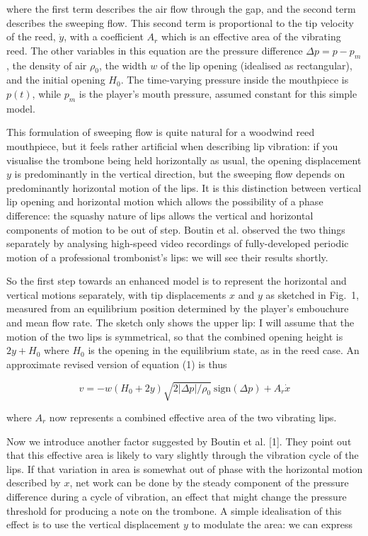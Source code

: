   where the first term describes the air flow through the gap, and the second 
  term describes the sweeping flow. This second term is proportional to the tip 
  velocity of the reed, $\dot{y}$, with a coefficient $A_r$ which is an 
  effective area of the vibrating reed. The other variables in this equation 
  are the pressure difference $\Delta p = p-p_m$, the density of air $\rho_0$, 
  the width $w$ of the lip opening (idealised as rectangular), and the initial 
  opening $H_0$. The time-varying pressure inside the mouthpiece is $p(t)$, 
  while $p_m$ is the player's mouth pressure, assumed constant for this simple 
  model. 

  This formulation of sweeping flow is quite natural for a woodwind reed 
  mouthpiece, but it feels rather artificial when describing lip vibration: if 
  you visualise the trombone being held horizontally as usual, the opening 
  displacement $y$ is predominantly in the vertical direction, but the sweeping 
  flow depends on predominantly horizontal motion of the lips. It is this 
  distinction between vertical lip opening and horizontal motion which allows 
  the possibility of a phase difference: the squashy nature of lips allows the 
  vertical and horizontal components of motion to be out of step. Boutin et al. 
  observed the two things separately by analysing high-speed video recordings 
  of fully-developed periodic motion of a professional trombonist's lips: we 
  will see their results shortly. 

  So the first step towards an enhanced model is to represent the horizontal 
  and vertical motions separately, with tip displacements $x$ and $y$ as 
  sketched in Fig.\ 1, measured from an equilibrium position determined by the 
  player's embouchure and mean flow rate. The sketch only shows the upper lip: 
  I will assume that the motion of the two lips is symmetrical, so that the 
  combined opening height is $2y+H_0$ where $H_0$ is the opening in the 
  equilibrium state, as in the reed case. An approximate revised version of 
  equation (1) is thus 

  $$v=-w(H_0+2y) \sqrt{2 |\Delta p|/\rho_0} \mathrm{~sign} (\Delta p)+A_r 
  \dot{x} \tag{2}$$ 

  where $A_r$ now represents a combined effective area of the two vibrating 
  lips. 

  Now we introduce another factor suggested by Boutin et al. [1]. They point 
  out that this effective area is likely to vary slightly through the vibration 
  cycle of the lips. If that variation in area is somewhat out of phase with 
  the horizontal motion described by $x$, net work can be done by the steady 
  component of the pressure difference during a cycle of vibration, an effect 
  that might change the pressure threshold for producing a note on the 
  trombone. A simple idealisation of this effect is to use the vertical 
  displacement $y$ to modulate the area: we can express 

